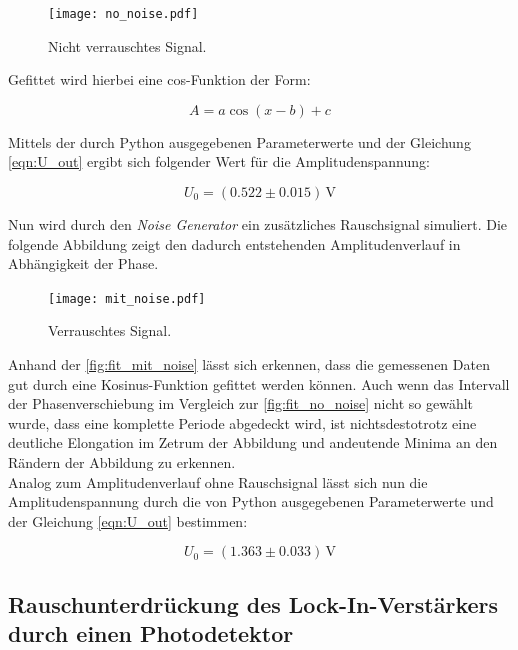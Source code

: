 \begin{figure}[H]
    \texttt{[image: no\_noise.pdf]}
    \caption{Nicht verrauschtes Signal.}
    \label{fig:fit_no_noise}
\end{figure}

\noindent
Gefittet wird hierbei eine cos-Funktion der Form:

\begin{equation*}
    A = a\cos(x - b) + c
\end{equation*}

\noindent Mittels der durch Python ausgegebenen Parameterwerte und der Gleichung \eqref{eqn:U_out} ergibt sich folgender Wert 
für die Amplitudenspannung:

\begin{equation*}
    U_0 = (0.522 \pm 0.015)\,\unit{\volt}
\end{equation*}

\noindent Nun wird durch den \emph{Noise Generator} ein zusätzliches Rauschsignal simuliert. Die folgende Abbildung zeigt den
dadurch entstehenden Amplitudenverlauf in Abhängigkeit der Phase.

\begin{figure}[H]
    \texttt{[image: mit\_noise.pdf]}
    \caption{Verrauschtes Signal.}
    \label{fig:fit_mit_noise}
\end{figure}

\noindent
Anhand der \autoref{fig:fit_mit_noise} lässt sich erkennen, dass die gemessenen Daten gut durch eine Kosinus-Funktion gefittet werden 
können. Auch wenn das Intervall der Phasenverschiebung im Vergleich zur \autoref{fig:fit_no_noise} nicht so gewählt 
wurde, dass eine komplette Periode abgedeckt wird, ist nichtsdestotrotz eine deutliche Elongation im Zetrum der Abbildung und 
andeutende Minima an den Rändern der Abbildung zu erkennen.\\
Analog zum Amplitudenverlauf ohne Rauschsignal lässt sich nun die Amplitudenspannung durch die von Python ausgegebenen Parameterwerte
und der Gleichung \eqref{eqn:U_out} bestimmen:

\begin{equation*}
    U_0 = (1.363 \pm 0.033)\,\unit{\volt}
\end{equation*}

\subsection{Rauschunterdrückung des Lock-In-Verstärkers durch einen Photodetektor}

